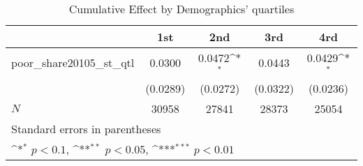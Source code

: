 \begin{table}[htbp]\centering
\def\sym#1{\ifmmode^{#1}\else\(^{#1}\)\fi}
\caption{Cumulative Effect by Demographics' quartiles}
\begin{tabular}{l*{4}{c}}
\hline\hline
            &\multicolumn{1}{c}{1st}&\multicolumn{1}{c}{2nd}&\multicolumn{1}{c}{3rd}&\multicolumn{1}{c}{4rd}\\
\hline
poor\_share20105\_st\_qtl&      0.0300         &      0.0472\sym{*}  &      0.0443         &      0.0429\sym{*}  \\
            &    (0.0289)         &    (0.0272)         &    (0.0322)         &    (0.0236)         \\
\hline
\(N\)       &       30958         &       27841         &       28373         &       25054         \\
\hline\hline
\multicolumn{5}{l}{\footnotesize Standard errors in parentheses}\\
\multicolumn{5}{l}{\footnotesize \sym{*} \(p<0.1\), \sym{**} \(p<0.05\), \sym{***} \(p<0.01\)}\\
\end{tabular}
\end{table}
